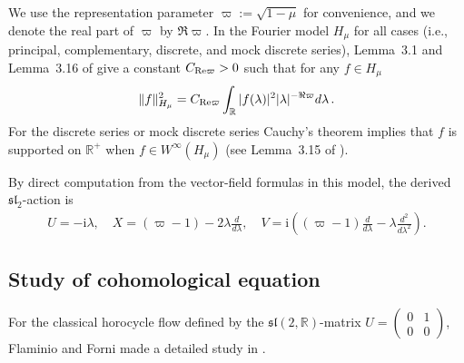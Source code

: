 \documentclass[11 pt]{amsart}
\newcommand{\RR}{\mathbb{R}}
\newcommand{\R}{\mathbb{R}}
\theoremstyle{definition}
\numberwithin{equation}{section}
\newcommand \re {{%
\operatorname{Re}
}}
\begin{document}
  We use the representation parameter $\varpi := \sqrt{1 - \mu}$ for convenience, and we denote the real part of $\varpi$ by $\Re\varpi$. In the Fourier model $H_\mu$ for all cases (i.e., principal, complementary, discrete, and mock discrete series),  Lemma~3.1 and Lemma~3.16 of \cite{flaminio2016effective} give a
constant $C_{\re\varpi} > 0$ such that for any $f\in H_\mu$
\begin{equation*}
\Vert f \Vert_{H_\mu}^2 = C_{\re\varpi} \int_{\R} |f(\lambda)|^2 \vert \lambda\vert^{-\Re\varpi} d\lambda\,.
\end{equation*}
For the discrete series or mock discrete series Cauchy's theorem implies that $f$ is supported on $\R^+$ when $f \in W^\infty(H_\mu)$ (see Lemma~3.15 of \cite{flaminio2016effective}).

By direct computation from the vector-field formulas in this model, the derived \(\mathfrak{sl}_2\)-action is
\begin{align}\label{for:47}
U = -\textrm{i} \lambda, \quad X = (\varpi -1) - 2\lambda \frac{d}{d\lambda}, \quad V = \textrm{i}\left((\varpi-1) \frac{d}{d\lambda} - \lambda \frac{d^2}{d\lambda^2}\right).
\end{align}

\subsection{Study of cohomological equation}\label{sec:18}  For the classical horocycle flow defined by the $\mathfrak{sl}(2,\RR)$-matrix $U=\begin{pmatrix}
  0 & 1 \\
  0 & 0
\end{pmatrix}$, Flaminio and Forni made a detailed study in \cite{Forni}.
\end{document}
